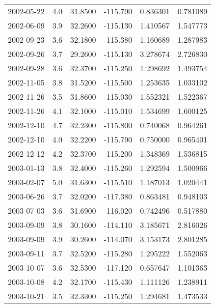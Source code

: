 \begin{tabular}{lrrrrr}
2002-05-22 &       4.0 &  31.8500 &  -115.790 &         0.836301 &         0.781089 \\
2002-06-09 &       3.9 &  32.2600 &  -115.130 &         1.410567 &         1.547773 \\
2002-09-23 &       3.6 &  32.1800 &  -115.380 &         1.160689 &         1.287983 \\
2002-09-26 &       3.7 &  29.2600 &  -115.130 &         3.278674 &         2.726830 \\
2002-09-28 &       3.6 &  32.3700 &  -115.250 &         1.298692 &         1.493754 \\
2002-11-05 &       3.8 &  31.5200 &  -115.500 &         1.253635 &         1.033102 \\
2002-11-26 &       3.5 &  31.8600 &  -115.030 &         1.552321 &         1.522367 \\
2002-11-26 &       4.1 &  32.1000 &  -115.010 &         1.534699 &         1.600125 \\
2002-12-10 &       4.7 &  32.2300 &  -115.800 &         0.740068 &         0.964261 \\
2002-12-10 &       4.0 &  32.2200 &  -115.790 &         0.750000 &         0.965401 \\
2002-12-12 &       4.2 &  32.3700 &  -115.200 &         1.348369 &         1.536815 \\
2003-01-13 &       3.8 &  32.4000 &  -115.260 &         1.292594 &         1.500966 \\
2003-02-07 &       5.0 &  31.6300 &  -115.510 &         1.187013 &         1.020441 \\
2003-06-26 &       3.7 &  32.0200 &  -117.380 &         0.863481 &         0.948103 \\
2003-07-03 &       3.6 &  31.6900 &  -116.020 &         0.742496 &         0.517880 \\
2003-09-09 &       3.8 &  30.1600 &  -114.110 &         3.185671 &         2.816026 \\
2003-09-09 &       3.9 &  30.2600 &  -114.070 &         3.153173 &         2.801285 \\
2003-09-11 &       3.7 &  32.5200 &  -115.280 &         1.295222 &         1.552063 \\
2003-10-07 &       3.6 &  32.5300 &  -117.120 &         0.657647 &         1.101363 \\
2003-10-08 &       4.2 &  32.1700 &  -115.430 &         1.111126 &         1.238911 \\
2003-10-21 &       3.5 &  32.3300 &  -115.250 &         1.294681 &         1.473533 \\

\end{tabular}
